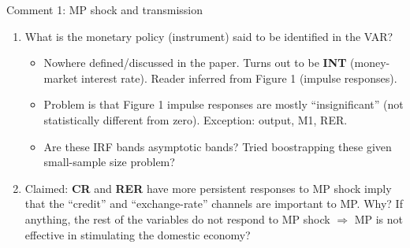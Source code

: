 \documentclass[10pt,english,slidetop,compress,
              blue,mathserif,color=option]{beamer}
\theoremstyle{plain}
\theoremstyle{definition}
\begin{document}
\begin{frame}{Comment 1: MP shock and transmission}

  \begin{enumerate}
    \item What is the monetary policy (instrument) said to be identified in the VAR?
    \begin{itemize}
        \item Nowhere defined/discussed in the paper. Turns out to be \textbf{INT} (money-market interest rate). Reader inferred from Figure 1 (impulse responses).
        
        \item Problem is that Figure 1 impulse responses are mostly ``insignificant'' (not statistically different from zero). Exception: output, M1, RER.
        
        \item Are these IRF bands asymptotic bands? Tried boostrapping these given small-sample size problem?
      \end{itemize}

    \item Claimed: \textbf{CR} and \textbf{RER} have more persistent responses to MP shock imply that the ``credit'' and ``exchange-rate'' channels are important to MP. Why? If anything, the rest of the variables do not respond to MP shock $\Rightarrow$ MP is not effective in stimulating the domestic economy?

    
  \end{enumerate}

\end{frame}
\end{document}
